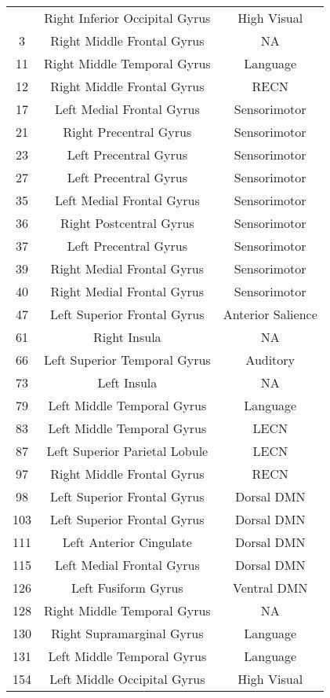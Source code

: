 \documentclass[10pt,letterpaper]{article}\usepackage[]{graphicx}\usepackage[]{color}
\begin{document}
\begin{center}
\begin{longtable}[c]{ccc}
		\bottomrule
		\endlastfoot
		2 & Right Inferior Occipital Gyrus & High Visual \\
		3 & Right Middle Frontal Gyrus & NA \\
		11 & Right Middle Temporal Gyrus & Language \\
		12 & Right Middle Frontal Gyrus	& RECN \\
		17 & Left Medial Frontal Gyrus & Sensorimotor \\
		21 & Right Precentral Gyrus	& Sensorimotor \\
		23 & Left Precentral Gyrus & Sensorimotor \\
		27 & Left Precentral Gyrus & Sensorimotor \\
		35 & Left Medial Frontal Gyrus & Sensorimotor \\
		36 & Right Postcentral Gyrus & Sensorimotor \\
		37 & Left Precentral Gyrus & Sensorimotor \\
		39 & Right Medial Frontal Gyrus	& Sensorimotor \\
		40 & Right Medial Frontal Gyrus	& Sensorimotor \\
		47 & Left Superior Frontal Gyrus & Anterior Salience \\
		61 & Right Insula & NA \\
		66 & Left Superior Temporal Gyrus & Auditory \\
		73 & Left Insula & NA \\
		79 & Left Middle Temporal Gyrus	& Language \\
		83 & Left Middle Temporal Gyrus	& LECN \\
		87 & Left Superior Parietal Lobule & LECN \\
		97 & Right Middle Frontal Gyrus	& RECN \\
		98 & Left Superior Frontal Gyrus & Dorsal DMN \\
		103	& Left Superior Frontal Gyrus & Dorsal DMN \\
		111	& Left Anterior Cingulate & Dorsal DMN \\
		115	& Left Medial Frontal Gyrus	& Dorsal DMN \\
		126	& Left Fusiform Gyrus & Ventral DMN \\
		128	& Right Middle Temporal Gyrus & NA \\
		130	& Right Supramarginal Gyrus	& Language \\
		131	& Left Middle Temporal Gyrus & Language \\
		154	& Left Middle Occipital Gyrus & High Visual \\

\end{longtable}
\end{center}
\end{document}
